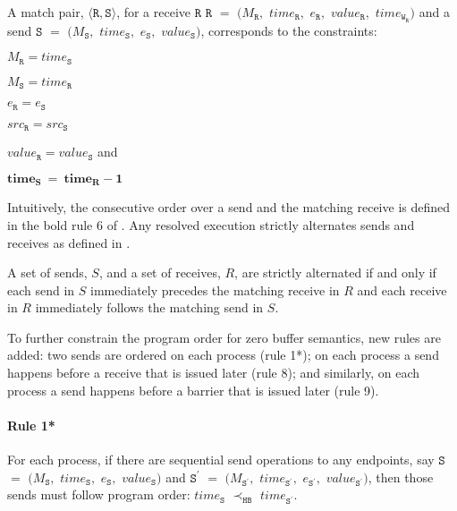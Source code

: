 \begin{definition} \label{def:match*}
A match pair, $\langle\mathtt{R}, \mathtt{S}\rangle$, for a receive
$\mathtt{R}$ $\mathtt{R}$ $=$ $(M_\mathtt{R},$ $\mathit{time}_\mathtt{R},$ $e_\mathtt{R},$ $\mathit{value}_\mathtt{R},$ $\mathit{time}_{\mathtt{W}_\mathtt{R}})$ and a send $\mathtt{S}$ $=$ $(M_\mathtt{S},$ $\mathit{time}_\mathtt{S},$ $e_\mathtt{S},$ $\mathit{value}_\mathtt{S})$, corresponds to the constraints:
\begin{compactenum}
\item $M_{\mathtt{R}} = \mathit{time}_{\mathtt{S}}$
\item $M_{\mathtt{S}} = \mathit{time}_{\mathtt{R}}$
\item $e_{\mathtt{R}} = e_{\mathtt{S}}$
\item $src_\mathtt{R} = src_\mathtt{S}$
\item $\mathit{value}_{\mathtt{R}} = \mathit{value}_{\mathtt{S}}$ and
\item $\mathit{\textbf{time}}_{\mathtt{\textbf{S}}}\ = \ \mathit{\textbf{time}}_{\mathtt{\textbf{R}}} - \mathit{\textbf{1}}$
\end{compactenum}
\end{definition}

Intuitively, the consecutive order over a send and the matching receive is defined in the bold rule $6$ of . Any resolved execution strictly alternates sends and receives as defined in . 

\begin{definition}\label{def:alternate}
A set of sends, $S$, and a set of receives, $R$, are strictly alternated if and only if each send in $S$ immediately precedes the matching receive in $R$ and each receive in $R$ immediately follows the matching send in $S$.
\end{definition}

To further constrain the program order for zero buffer semantics, new rules are added: two sends are ordered on each process (rule 1*); on each process a send happens before a receive that is issued later (rule 8); and similarly, on each process a send happens before a barrier that is issued later (rule 9).

\paragraph*{Rule 1*} For each process, if there are sequential send
operations to any endpoints, say $\mathtt{S}$ $=$ $(M_\mathtt{S},$ $\mathit{time}_\mathtt{S},$ $e_\mathtt{S},$ $\mathit{value}_\mathtt{S})$ and $\mathtt{S^\prime}$ $=$ $(M_\mathtt{S^\prime},$ $\mathit{time}_\mathtt{S^\prime},$ $e_\mathtt{S^\prime},$ $\mathit{value}_\mathtt{S^\prime})$, then those
sends must follow program order: $\mathit{time}_\mathtt{S}$
$\prec_\mathtt{HB}$ $\mathit{time}_\mathtt{S^\prime}$.

